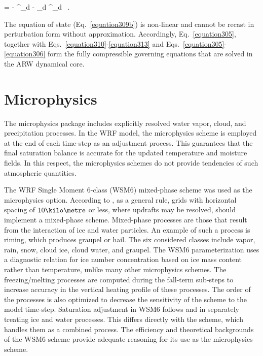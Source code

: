 \be
\pd{\phi^{\prime}}{\eta} = - \alpha^{\prime}_d - \alpha_d \mu^{\prime}_d \mbox{ .} \label{equation314}
\ee


The equation of state (Eq.~\ref{equation309b}) is non-linear and cannot be recast in perturbation form without approximation. Accordingly, Eq.~\eqref{equation305}, together with Eqs.~\eqref{equation310}-\eqref{equation313} and Eqs.~\eqref{equation305}-\eqref{equation306} form the fully compressible governing equations that are solved in the ARW dynamical core.

\section{Microphysics}
\label{mp-32}

The microphysics package includes explicitly resolved water vapor, cloud, and precipitation processes. In the WRF model, the microphysics scheme is employed at the end of each time-step as an adjustment process. This guarantees that the final saturation balance is accurate for the updated temperature and moisture fields. In this respect, the microphysics schemes do not provide tendencies of such atmospheric quantities.

The WRF Single Moment 6-class (WSM6) mixed-phase scheme was used as the microphysics option. According to  \citet{Skamarock}, as a general rule, grids with horizontal spacing of $10\kilo\metre$ or less, where updrafts may be resolved, should implement a mixed-phase scheme. Mixed-phase processes are those that result from the interaction of ice and water particles. An example of such a process is riming, which produces graupel or hail. The six considered classes include vapor, rain, snow, cloud ice, cloud water, and graupel. The WSM6 parameterization uses a diagnostic relation for ice number concentration based on ice mass content rather than temperature, unlike many other microphysics schemes. The freezing\slash melting processes are computed during the fall-term sub-steps to increase accuracy in the vertical heating profile of these processes. The order of the processes is also optimized to decrease the sensitivity of the scheme to the model time-step. Saturation adjustment in WSM6 follows  \citet{Dud89} and  \citet{Hong98} in separately treating ice and water processes. This differs directly with the \citet{Lin} scheme, which handles them as a combined process. The efficiency and theoretical backgrounds of the WSM6 scheme provide adequate reasoning for its use as the microphysics scheme.

